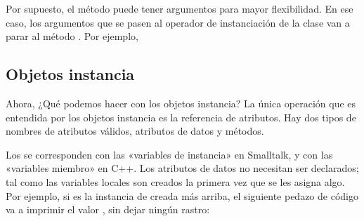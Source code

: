 \documentclass[a5paper,10pt,spanish]{sphinxmanual}
\begin{document}
\sphinxAtStartPar
Por supuesto, el método  puede tener argumentos para mayor flexibilidad.  En ese caso, los argumentos que se pasen al operador de instanciación de la clase van a parar al método .  Por ejemplo,

\begin{sphinxVerbatim}[commandchars=\\\{\}]
 
       
          
          
   
 
\end{sphinxVerbatim}


\subsection{Objetos instancia}
\label{\detokenize{tutorial/classes:instance-objects}}\label{\detokenize{tutorial/classes:tut-instanceobjects}}
\sphinxAtStartPar
Ahora, ¿Qué podemos hacer con los objetos instancia?  La única operación que es entendida por los objetos instancia es la referencia de atributos.  Hay dos tipos de nombres de atributos válidos, atributos de datos y métodos.

\sphinxAtStartPar
Los  se corresponden con las «variables de instancia» en Smalltalk, y con las «variables miembro» en C++.  Los atributos de datos no necesitan ser declarados; tal como las variables locales son creados la primera vez que se les asigna algo.  Por ejemplo, si  es la instancia de  creada más arriba, el siguiente pedazo de código va a imprimir el valor , sin dejar ningún rastro:

\begin{sphinxVerbatim}[commandchars=\\\{\}]
  
   
        
 
\end{sphinxVerbatim}
\end{document}
